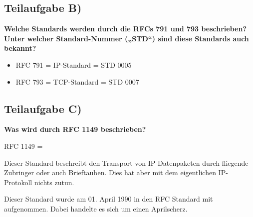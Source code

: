 \clearpage 

\subsection{Teilaufgabe B)}
\textbf{Welche Standards werden durch die RFCs 791 und 793 beschrieben? Unter welcher
Standard-Nummer („STD“) sind diese Standards auch bekannt?}

\begin{itemize}
  \item RFC 791 = IP-Standard = STD 0005
  \item RFC 793 = TCP-Standard = STD 0007
\end{itemize}

\subsection{Teilaufgabe C)}
\textbf{Was wird durch RFC 1149 beschrieben?}

RFC 1149 = 

Dieser Standard beschreibt den Transport von IP-Datenpaketen durch fliegende
Zubringer oder auch Brieftauben. Dies hat aber mit dem eigentlichen
IP-Protokoll nichts zutun.

Dieser Standard wurde am 01. April 1990 in den RFC Standard mit aufgenommen.
Dabei handelte es sich um einen Aprilscherz.
\clearpage 
